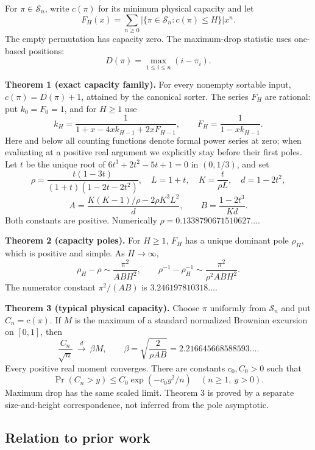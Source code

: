 \documentclass[11pt,letterpaper]{article}
\begin{document}
For \(\pi\in\mathcal S_n\), write \(c(\pi)\) for its minimum physical
capacity and let \[
 F_H(x)=\sum_{n\ge0}|\{\pi\in\mathcal S_n:c(\pi)\le H\}|x^n.
\] The empty permutation has capacity zero. The maximum-drop statistic
uses one-based positions: \[D(\pi)=\max_{1\le i\le n}(i-\pi_i).\]

\textbf{Theorem 1 (exact capacity family).} For every nonempty sortable
input, \(c(\pi)=D(\pi)+1\), attained by the canonical sorter. The series
\(F_H\) are rational: put \(k_0=F_0=1\), and for \(H\ge1\) use \[
 k_H=\frac1{1+x-4xk_{H-1}+2xF_{H-1}},\qquad
 F_H=\frac1{1-xk_{H-1}}.                                      \tag{1}
\] Here and below all counting functions denote formal power series at
zero; when evaluating at a positive real argument we explicitly stay
before their first poles. Let \(t\) be the unique root of
\(6t^3+2t^2-5t+1=0\) in \((0,1/3)\), and set \[
 \rho=\frac{t(1-3t)}{(1+t)(1-2t-2t^2)},\quad
 L=1+t,\quad K=\frac{t}{\rho L},\quad d=1-2t^2,
\] \[
 A=\frac{K(K-1)/\rho-2\rho K^3L^2}{d},\qquad
 B=\frac{1-2t^3}{Kd}.                                         \tag{2}
\] Both constants are positive. Numerically
\(\rho=0.1338790671510627\ldots\).

\textbf{Theorem 2 (capacity poles).} For \(H\ge1\), \(F_H\) has a unique
dominant pole \(\rho_H\), which is positive and simple. As
\(H\to\infty\), \[
 \rho_H-\rho\sim\frac{\pi^2}{ABH^2},\qquad
 \rho^{-1}-\rho_H^{-1}\sim\frac{\pi^2}{\rho^2ABH^2}.             \tag{3}
\] The numerator constant \(\pi^2/(AB)\) is \(3.246197810318\ldots\).

\textbf{Theorem 3 (typical physical capacity).} Choose \(\pi\) uniformly
from \(\mathcal S_n\) and put \(C_n=c(\pi)\). If \(M\) is the maximum of
a standard normalized Brownian excursion on \([0,1]\), then \[
 \frac{C_n}{\sqrt n}\ \xrightarrow{\ d\ }\ \beta M,\qquad
 \beta=\sqrt{\frac2{\rho AB}}=2.216645668588593\ldots .          \tag{4}
\] Every positive real moment converges. There are constants
\(c_0,C_0>0\) such that \[
 \Pr(C_n>y)\le C_0\exp(-c_0y^2/n)\quad(n\ge1,\ y>0).          \tag{5}
\] Maximum drop has the same scaled limit. Theorem 3 is proved by a
separate size-and-height correspondence, not inferred from the pole
asymptotic.

\subsection{Relation to prior work}\label{relation-to-prior-work}
\end{document}
